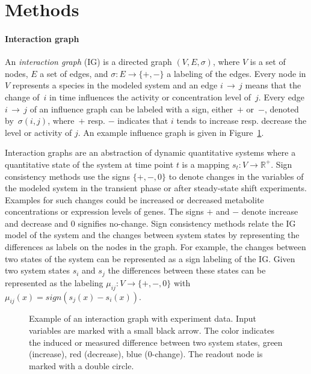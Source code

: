 
\section{Methods} \label{method}

\paragraph*{\bf Interaction graph}

An \emph{interaction graph} (IG) is a directed graph $(V,E,\sigma)$,
 where
 $V$ is a set of nodes,
 $E$ a set of edges, and
 $\sigma : E \rightarrow \{\plus,\minus\}$ a labeling of the edges.
Every node in $V$ represents a species in the modeled system and
an edge $i {\,\rightarrow\,} j$ means that the change of~$i$ in time
influences the activity or concentration level of~$j$.
Every edge $i {\,\rightarrow\,} j$ of an influence graph can be labeled with a
sign, either~$\plus$ or~$\minus$, denoted by~$\sigma(i,j)$,
where~$\plus$ resp. $\minus$ indicates that $i$ tends to increase resp. decrease the level or activity of $j$.
An example influence graph is given in Figure~\ref{fig:complex_example}.

Interaction graphs are an abstraction of dynamic
quantitative systems where a quantitative state of the system at time point $t$
is a mapping $s_t : V \rightarrow \mathbb{R}^+$.
Sign consistency methods use the signs $\{\plus, \minus, 0\}$ to denote changes
in the variables of the modeled system in the transient phase or after
steady-state shift experiments.
Examples for such changes could be increased or decreased metabolite
concentrations or expression levels of genes.
The signs $\plus$ and $\minus$ denote increase and decrease and 0 signifies no-change.
Sign consistency methods relate the IG model of the system and the changes
between system states by representing the differences as labels on the nodes in
the graph.
For example, the changes between two states of the system can be represented as
a sign labeling of the IG.
Given two system states $s_i$ and $s_j$ the differences between these states
can be represented as the labeling
$\mu_{ij} : V \rightarrow \{\plus, \minus, 0\}$ with
$\mu_{ij}(x) = sign(s_j(x) - s_i(x))$.

\begin{figure}[ht]
\begin{center}

\caption{
Example of an interaction graph with experiment data.
Input variables are marked with a small black arrow.
The color indicates the induced or measured difference between two system states,
 green (increase), red (decrease), blue (0-change).
The readout node is marked with a double circle.
}
\label{fig:complex_example}
\end{center}
\end{figure}


